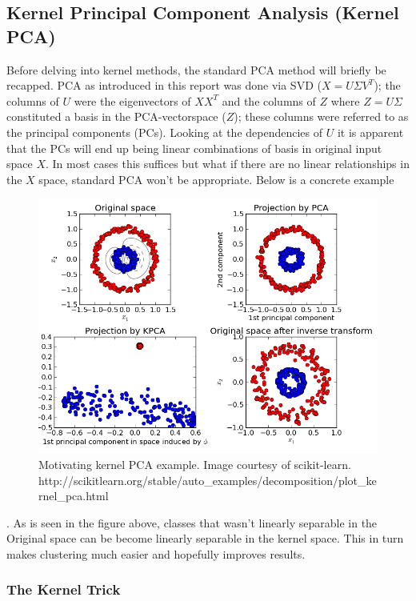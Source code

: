 \subsection{Kernel Principal Component Analysis (Kernel PCA)}

Before delving into kernel methods, the standard PCA method will briefly be recapped. PCA as introduced in this report was done via SVD ($X=U\Sigma V^T$); the columns of $U$ were the eigenvectors of $XX^T$ and the columns of $Z$ where $Z=U\Sigma$ constituted a basis in the PCA-vectorspace ($Z$); these columns were referred to as the principal components (PCs). 
Looking at the dependencies of $U$ it is apparent that the PCs will end up being linear combinations of basis in original input space $X$. 
In most cases this suffices but what if there are no linear relationships in the $X$ space, standard PCA won't be appropriate.
Below is a concrete example

\begin{figure}[H]
	\center
	\includegraphics[width=\textwidth]{figures/kernel_pca_example.png}
	\caption{Motivating kernel PCA example. Image courtesy of scikit-learn. http://scikitlearn.org/stable/auto\_examples/decomposition/plot\_kernel\_pca.html }
	\label{fig:motivation_kernelpca}
\end{figure}.
As is seen in the figure above, classes that wasn't linearly separable in the Original space can be become linearly separable in the kernel space. This in turn makes clustering much easier and hopefully improves results.

\subsubsection{The Kernel Trick}

